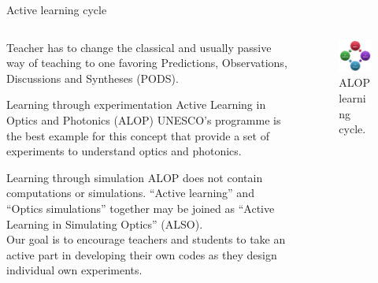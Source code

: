 \documentclass[serif ,mathserif, 8pt]{beamer}
\begin{document}
\begin{frame}{Active learning cycle}
	\begin{columns}[c]
		\begin{column}{0.6\textwidth}
				Teacher has to change the classical and usually passive way of teaching to one favoring Predictions, Observations, Discussions and Syntheses (PODS).
				
				
		\begin{exampleblock}{Learning through experimentation}
			Active Learning in Optics and Photonics (ALOP) UNESCO’s programme is the best example for this concept that provide a set of experiments to understand optics and photonics.
		\end{exampleblock}
		\begin{alertblock}{Learning through simulation}
			ALOP does not contain computations or simulations. “Active learning” and “Optics simulations” together may be joined as “Active Learning in Simulating Optics” (ALSO).\\
			Our goal is to encourage teachers and students to take an active part in developing their own codes as they design individual own experiments.\\
			
		\end{alertblock}
		\end{column}
		\begin{column}{0.4\textwidth}
			\begin{figure}
				\includegraphics[width=\linewidth]{images/alop_cycle}
				\caption{ALOP learning cycle.}
			\end{figure}
		\end{column}
	\end{columns}
		
\end{frame}
\end{document}
